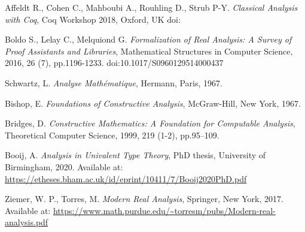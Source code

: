 \documentclass[12pt,twoside,draft]{cmpart}
\begin{document}
\begin{thebibliography}{999}


 Affeldt R., Cohen C., Mahboubi A., Rouhling D.,  Strub P-Y. \emph{Classical Analysis with Coq},
Coq Workshop 2018, Oxford, UK doi:

 Boldo S., Lelay C., Melquiond G. \emph{Formalization of Real Analysis: A Survey of Proof Assistants and Libraries},
Mathematical Structures in Computer Science, 2016, 26 (7), pp.1196-1233. doi:10.1017/S0960129514000437

 Schwartz, L. \emph{Analyse Mathématique}, Hermann, Paris, 1967.

 Bishop, E. \emph{Foundations of Constructive Analysis}, McGraw-Hill, New York, 1967.

 Bridges, D. \emph{Constructive Mathematics: A Foundation for Computable Analysis}, Theoretical Computer Science, 1999, 219 (1-2), pp.95--109.

 Booij, A. \emph{Analysis in Univalent Type Theory}, PhD thesis, University of Birmingham, 2020. Available at: \url{https://etheses.bham.ac.uk/id/eprint/10411/7/Booij2020PhD.pdf}

 Ziemer, W. P., Torres, M. \emph{Modern Real Analysis}, Springer, New York, 2017. Available at: \url{https://www.math.purdue.edu/~torresm/pubs/Modern-real-analysis.pdf}

\end{thebibliography}
\end{document}
